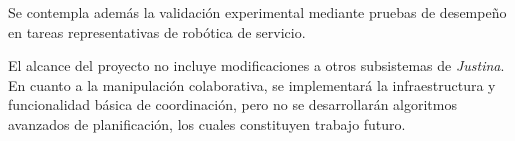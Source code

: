 Se contempla además la validación experimental mediante pruebas de desempeño en tareas representativas de robótica de servicio.

El alcance del proyecto no incluye modificaciones a otros subsistemas de \emph{Justina}. En cuanto a la manipulación colaborativa, se implementará la infraestructura y funcionalidad básica de coordinación, pero no se desarrollarán algoritmos avanzados de planificación, los cuales constituyen trabajo futuro.